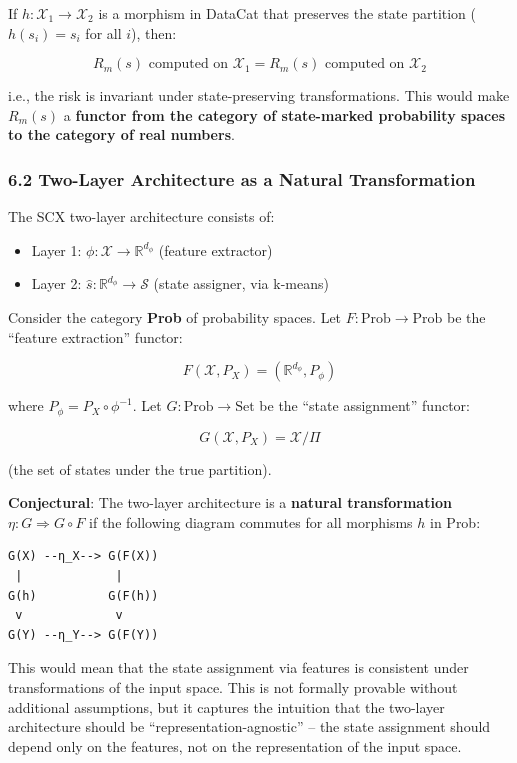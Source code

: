 \documentclass[
  12pt,
]{article}
\providecommand{\tightlist}{%
  \setlength{\itemsep}{0pt}\setlength{\parskip}{0pt}}
\begin{document}
If \(h: \mathcal{X}_1 \to \mathcal{X}_2\) is a morphism in DataCat that
preserves the state partition (\(h(s_i) = s_i\) for all \(i\)), then:

\[R_m(s) \text{ computed on } \mathcal{X}_1 = R_m(s) \text{ computed on } \mathcal{X}_2\]

i.e., the risk is invariant under state-preserving transformations. This
would make \(R_m(s)\) a \textbf{functor from the category of
state-marked probability spaces to the category of real numbers}.

\subsubsection{6.2 Two-Layer Architecture as a Natural
Transformation}\label{two-layer-architecture-as-a-natural-transformation}

The SCX two-layer architecture consists of:

\begin{itemize}
\tightlist
\item
  Layer 1: \(\phi: \mathcal{X} \to \mathbb{R}^{d_\phi}\) (feature
  extractor)
\item
  Layer 2: \(\hat{s}: \mathbb{R}^{d_\phi} \to \mathcal{S}\) (state
  assigner, via k-means)
\end{itemize}

Consider the category \textbf{Prob} of probability spaces. Let
\(F: \text{Prob} \to \text{Prob}\) be the ``feature extraction''
functor:

\[F(\mathcal{X}, P_X) = (\mathbb{R}^{d_\phi}, P_\phi)\]

where \(P_\phi = P_X \circ \phi^{-1}\). Let
\(G: \text{Prob} \to \text{Set}\) be the ``state assignment'' functor:

\[G(\mathcal{X}, P_X) = \mathcal{X}/\Pi\]

(the set of states under the true partition).

\textbf{Conjectural}: The two-layer architecture is a \textbf{natural
transformation} \(\eta: G \Rightarrow G \circ F\) if the following
diagram commutes for all morphisms \(h\) in Prob:

\begin{verbatim}
G(X) --η_X--> G(F(X))
 |             |
G(h)          G(F(h))
 v             v
G(Y) --η_Y--> G(F(Y))
\end{verbatim}

This would mean that the state assignment via features is consistent
under transformations of the input space. This is not formally provable
without additional assumptions, but it captures the intuition that the
two-layer architecture should be ``representation-agnostic'' -- the
state assignment should depend only on the features, not on the
representation of the input space.
\end{document}
